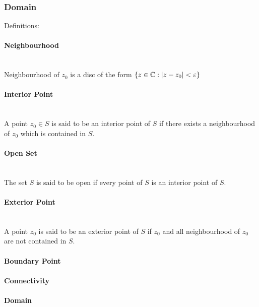 \documentclass[UTF8]{ctexart} %
\numberwithin{equation}{section}
\begin{document}
\subsubsection{Domain}
Definitions:
\paragraph{Neighbourhood}~\\
Neighbourhood of $z_0$ is a disc of the form $\{z\in\mathbb{C}:\abs{z - z_0}<\varepsilon\}$
\paragraph{Interior Point}~\\
A point $z_0 \in S$ is said to be an interior point of $S$
if there exists a neighbourhood of $z_0$ which is contained in $S$.
\paragraph{Open Set}~\\
The set $S$ is said to be open if every point of $S$ is an interior point of $S$.
\paragraph{Exterior Point}~\\
A point $z_0$ is said to be an exterior point of $S$
if $z_0$ and all neighbourhood of $z_0$ are not contained in $S$.
\paragraph{Boundary Point}
\paragraph{Connectivity}
\paragraph{Domain}
\end{document}
